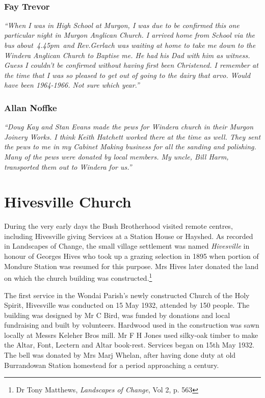 ~



\subsubsection{Fay Trevor}



\emph{``When I was in High School at Murgon, I was due to be confirmed this one particular night in Murgon Anglican Church. I arrived home from School via the bus about~4.45pm~and Rev.Gerlach was waiting at home to take me down to the Windera Anglican Church to Baptise me. He had his Dad with him as witness. Guess I couldn't be confirmed without having first been Christened. I remember at the time that I was so pleased to get out of going to the dairy that arvo. Would have been 1964-1966. Not sure which year.''}



\subsubsection{Allan Noffke}



\emph{``Doug Kay and Stan Evans made the pews for Windera church in their Murgon Joinery Works. I think Keith Hatchett worked there at the time as well. They sent the pews to me in my Cabinet Making business for all the sanding and polishing. Many of the pews were donated by local members. My uncle, Bill Harm, transported them out to Windera for us.''}



\section{Hivesville Church}



During the very early days the Bush Brotherhood visited remote centres, including Hivesville giving Services at a Station House or Hayshed. As recorded in Landscapes of Change, the small village settlement was named \emph{Hivesville} in honour of Georges Hives who took up a grazing selection in 1895 when portion of Mondure Station was resumed for this purpose. Mrs Hives later donated the land on which the church building was constructed.\footnote{Dr Tony Matthews, \emph{Landscapes of Change}, Vol 2, p. 563}


The first service in the Wondai Parish's newly constructed Church of the Holy Spirit, Hivesville was conducted on 15 May 1932, attended by 150 people. The building was designed by Mr C Bird, was funded by donations and local fundraising and built by volunteers. Hardwood used in the construction was sawn locally at Messrs Keleher Bros mill. Mr F H Jones used silky-oak timber to make the Altar, Font, Lectern and Altar book-rest. Services began on 15th May 1932. The bell was donated by Mrs Marj Whelan, after having done duty at old Burrandowan Station homestead for a period approaching a century.



